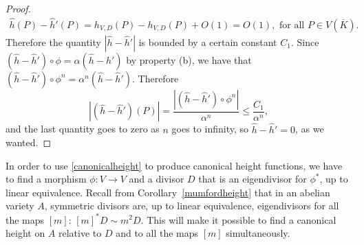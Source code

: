 \documentclass[a4paper, 12pt]{amsart}
\theoremstyle{definition}
\theoremstyle{plain}
\theoremstyle{plain}
\theoremstyle{plain}
\theoremstyle{plain}
\theoremstyle{remark}
\theoremstyle{remark}
\theoremstyle{plain}
\newcommand{\corref}[1]{Corollary~\ref{#1}}
\begin{document}
\begin{proof}
		\begin{align*}
			\hat{h}(P)-\hat{h}'(P)=h_{V,D}(P)-h_{V,D}(P)+O(1)=O(1),\text{ for all }P\in V(\overline{K}).
		\end{align*}
		Therefore the quantity $|\hat{h}-\hat{h}'|$ is bounded by a certain constant $C_1$. Since $(\hat{h}-\hat{h}')\circ\phi=\alpha(\hat{h}-\hat{h}')$ by property (b), we have that $(\hat{h}-\hat{h}')\circ\phi^n=\alpha^n(\hat{h}-\hat{h}')$. Therefore
		\begin{equation*}
			|(\hat{h}-\hat{h}')(P)|=\frac{|(\hat{h}-\hat{h}')\circ\phi^n|}{\alpha^n}\le \frac{C_1}{\alpha^n},
		\end{equation*}
		and the last quantity goes to zero as $n$ goes to infinity, so $\hat{h}-\hat{h}'=0$, as we wanted.
	\end{proof}
	
	In order to use \ref{canonicalheight} to produce canonical height functions, we have to find a morphism $\phi:V\rightarrow V$ and a divisor $D$ that is an eigendivisor for $\phi^*$, up to linear equivalence. Recall from \corref{mumfordheight} that in an abelian variety $A$, symmetric divisors are, up to linear equivalence, eigendivisors for all the maps $[m]$: $[m]^*D\sim m^2D$. This will make it possible to find a canonical height on $A$ relative to $D$ and to all the maps $[m]$ simultaneously.
	
\end{document}
